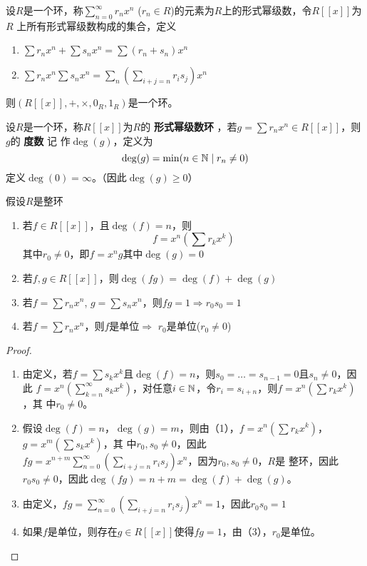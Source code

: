 \documentclass[11pt]{article}
\begin{document}
\begin{examplle}[]
设\(R\)是一个环，称\(\sum_{n=0}^\infty r_nx^n\) (\(r_n\in R\))的元素为\(R\)上的形式幂级数，令\(R[[x]]\)为\(R\)
上所有形式幂级数构成的集合，定义
\begin{enumerate}
\item \(\sum r_nx^n+\sum s_nx^n=\sum(r_n+s_n)x^n\)
\item \(\sum r_nx^n\sum s_nx^n=\sum_n(\sum_{i+j=n}r_is_j)x^n\)
\end{enumerate}


则\((R[[x]],+,\times,0_R,1_R)\)是一个环。
\end{examplle}

\begin{definition}[]
设\(R\)是一个环，称\(R[[x]]\)为\(R\)的 \textbf{形式幂级数环} ，若\(g=\sum r_nx^n\in R[[x]]\)，则\(g\)的 \textbf{度数} 记
作\(\deg(g)\)，定义为
\begin{equation*}
\deg(g)=\min(n\in\mathbb{N}\mid r_n\neq 0)
\end{equation*}
定义\(\deg(0)=\infty\)。（因此\(\deg(g)\ge 0\)）
\end{definition}


\begin{lemma}[]
假设\(R是整环\)
\begin{enumerate}
\item 若\(f\in R[[x]]\)，且\(\deg(f)=n\)，则
\begin{equation*}
f=x^n(\sum r_kx^k)
\end{equation*}
其中\(r_0\neq 0\)，即\(f=x^ng\)其中\(\deg(g)=0\)
\item 若\(f,g\in R[[x]]\)，则\(\deg(fg)=\deg(f)+\deg(g)\)
\item 若\(f=\sum r_nx^n\), \(g=\sum s_nx^n\)，则\(fg=1\Rightarrow r_0s_0=1\)
\item 若\(f=\sum r_nx^n\)，则\(f\)是单位\(\Rightarrow\) \(r_0\)是单位(\(r_0\neq 0\))
\end{enumerate}
\end{lemma}

\begin{proof}
\begin{enumerate}
\item 由定义，若\(f=\sum s_kx^k\)且\(\deg(f)=n\)，则\(s_0=\dots=s_{n-1}=0\)且\(s_n\neq 0\)，因此
\(f=x^n(\sum_{k=n}^\infty s_kx^k)\)，对任意\(i\in\mathbb{N}\)，令\(r_i=s_{i+n}\)，则\(f=x^n(\sum r_kx^k)\)，其
中\(r_0\neq 0\)。
\item 假设\(\deg(f)=n\)，\(\deg(g)=m\)，则由（1），\(f=x^n(\sum r_kx^k)\)，\(g=x^m(\sum s_kx^k)\)，其
中\(r_0,s_0\neq 0\)，因此\(fg=x^{n+m}\sum_{n=0}^\infty(\sum_{i+j=n}r_is_j)x^n\)，因为\(r_0,s_0\neq 0\)，\(R\)是
整环，因此\(r_0s_0\neq 0\)，因此\(\deg(fg)=n+m=\deg(f)+\deg(g)\)。
\item 由定义，\(fg=\sum_{n=0}^\infty(\sum_{i+j=n}r_is_j)x^n=1\)，因此\(r_0s_0=1\)
\item 如果\(f\)是单位，则存在\(g\in R[[x]]\)使得\(fg=1\)，由（3），\(r_0\)是单位。
\end{enumerate}
\end{proof}
\end{document}
